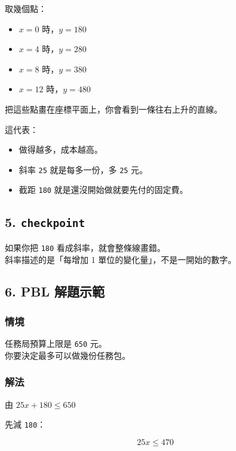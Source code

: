 \documentclass[
  chinese,
  12pt,
  a4paper,
  oneside]{article}
\providecommand{\tightlist}{%
  \setlength{\itemsep}{0pt}\setlength{\parskip}{0pt}}
\begin{document}
取幾個點：

\begin{itemize}
\tightlist
\item
  \(x = 0\) 時，\(y = 180\)
\item
  \(x = 4\) 時，\(y = 280\)
\item
  \(x = 8\) 時，\(y = 380\)
\item
  \(x = 12\) 時，\(y = 480\)
\end{itemize}

把這些點畫在座標平面上，你會看到一條往右上升的直線。

這代表：

\begin{itemize}
\tightlist
\item
  做得越多，成本越高。
\item
  斜率 \texttt{25} 就是每多一份，多 \texttt{25} 元。
\item
  截距 \texttt{180} 就是還沒開始做就要先付的固定費。
\end{itemize}

\subsection{\texorpdfstring{5.
\texttt{checkpoint}}{5. checkpoint}}\label{checkpoint-2}

如果你把 \texttt{180} 看成斜率，就會整條線畫錯。\\
斜率描述的是「每增加 1 單位的變化量」，不是一開始的數字。

\subsection{6. PBL 解題示範}\label{pbl-ux89e3ux984cux793aux7bc4-1}

\subsubsection{情境}\label{ux60c5ux5883-2}

任務局預算上限是 \texttt{650} 元。\\
你要決定最多可以做幾份任務包。

\subsubsection{解法}\label{ux89e3ux6cd5}

由 \(25x + 180 \le 650\)

先減 \texttt{180}：

\[
25x \le 470
\]
\end{document}
